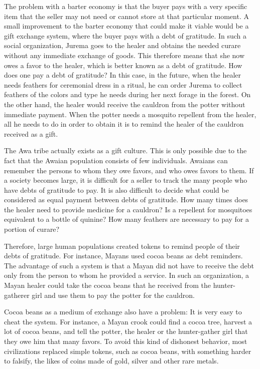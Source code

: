 \documentclass[
  12pt,
]{book}
\begin{document}
The problem with a barter economy is that the buyer pays with a very
specific item that the seller may not need or cannot store at that
particular moment. A small improvement to the barter economy that could
make it viable would be a gift exchange system, where the buyer pays
with a debt of gratitude. In such a social organization, Jurema goes to
the healer and obtains the needed curare without any immediate exchange
of goods. This therefore means that she now owes a favor to the healer,
which is better known as a debt of gratitude. How does one pay a debt of
gratitude? In this case, in the future, when the healer needs feathers
for ceremonial dress in a ritual, he can order Jurema to collect
feathers of the colors and type he needs during her next forage in the
forest. On the other hand, the healer would receive the cauldron from
the potter without immediate payment. When the potter needs a mosquito
repellent from the healer, all he needs to do in order to obtain it is
to remind the healer of the cauldron received as a gift.

The Awa tribe actually exists as a gift culture. This is only possible
due to the fact that the Awaian population consists of few individuals.
Awaians can remember the persons to whom they owe favors, and who owes
favors to them. If a society becomes large, it is difficult for a seller
to track the many people who have debts of gratitude to pay. It is also
difficult to decide what could be considered as equal payment between
debts of gratitude. How many times does the healer need to provide
medicine for a cauldron? Is a repellent for mosquitoes equivalent to a
bottle of quinine? How many feathers are necessary to pay for a portion
of curare?

Therefore, large human populations created tokens to remind people of
their debts of gratitude. For instance, Mayans used cocoa beans as debt
reminders. The advantage of such a system is that a Mayan did not have
to receive the debt only from the person to whom he provided a service.
In such an organization, a Mayan healer could take the cocoa beans that
he received from the hunter-gatherer girl and use them to pay the potter
for the cauldron.

Cocoa beans as a medium of exchange also have a problem: It is very easy
to cheat the system. For instance, a Mayan crook could find a cocoa
tree, harvest a lot of cocoa beans, and tell the potter, the healer or
the hunter-gather girl that they owe him that many favors. To avoid this
kind of dishonest behavior, most civilizations replaced simple tokens,
such as cocoa beans, with something harder to falsify, the likes of
coins made of gold, silver and other rare metals.
\end{document}
